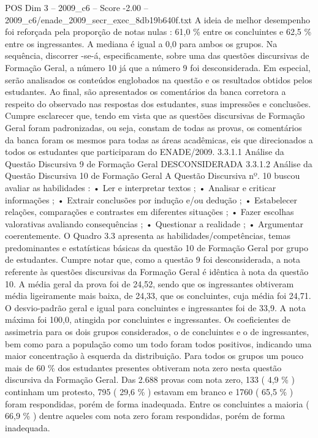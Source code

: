 \begin{textsample}{POS Dim 3 – 2009\_c6 – Score -2.00 – 2009\_c6/enade\_2009\_secr\_exec\_8db19b640f.txt}
A ideia de melhor desempenho foi reforçada pela proporção de notas nulas : 61,0 \% entre os concluintes e 62,5 \% entre os ingressantes.
A mediana é igual a 0,0 para ambos os grupos.
Na sequência, discorrer -se-á, especificamente, sobre uma das questões discursivas de Formação Geral, a número 10 já que a número 9 foi desconsiderada.
Em especial, serão analisados os conteúdos englobados na questão e os resultados obtidos pelos estudantes.
Ao final, são apresentados os comentários da banca corretora a respeito do observado nas respostas dos estudantes, suas impressões e conclusões.
Cumpre esclarecer que, tendo em vista que as questões discursivas de Formação Geral foram padronizadas, ou seja, constam de todas as provas, os comentários da banca foram os mesmos para todas as áreas acadêmicas, eis que direcionados a todos os estudantes que participaram do ENADE/2009. 3.3.1.1 Análise da Questão Discursiva 9 de Formação Geral DESCONSIDERADA 3.3.1.2 Análise da Questão Discursiva 10 de Formação Geral A Questão Discursiva nº. 10 buscou avaliar as habilidades : • Ler e interpretar textos ; • Analisar e criticar informações ; • Extrair conclusões por indução e/ou dedução ; • Estabelecer relações, comparações e contrastes em diferentes situações ; • Fazer escolhas valorativas avaliando consequências ; • Questionar a realidade ; • Argumentar coerentemente.
O Quadro 3.3 apresenta as habilidades/competências, temas predominantes e estatísticas básicas da questão 10 de Formação Geral por grupo de estudantes.
Cumpre notar que, como a questão 9 foi desconsiderada, a nota referente às questões discursivas da Formação Geral é idêntica à nota da questão 10.
A média geral da prova foi de 24,52, sendo que os ingressantes obtiveram média ligeiramente mais baixa, de 24,33, que os concluintes, cuja média foi 24,71.
O desvio-padrão geral e igual para concluintes e ingressantes foi de 33,9.
A nota máxima foi 100,0, atingida por concluintes e ingressantes.
Os coeficientes de assimetria para os dois grupos considerados, o de concluintes e o de ingressantes, bem como para a população como um todo foram todos positivos, indicando uma maior concentração à esquerda da distribuição.
Para todos os grupos um pouco mais de 60 \% dos estudantes presentes obtiveram nota zero nesta questão discursiva da Formação Geral.
Das 2.688 provas com nota zero, 133 ( 4,9 \% ) continham um protesto, 795 ( 29,6 \% ) estavam em branco e 1760 ( 65,5 \% ) foram respondidas, porém de forma inadequada.
Entre os concluintes a maioria ( 66,9 \% ) dentre aqueles com nota zero foram respondidas, porém de forma inadequada.

\end{textsample}
